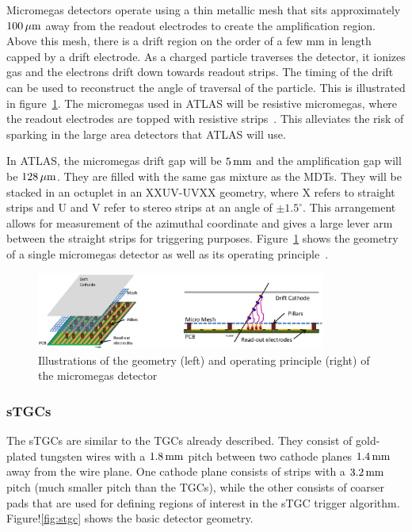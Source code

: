 Micromegas detectors operate using a thin metallic mesh that sits approximately $100\,\mu \rm m$ away from the readout electrodes to create the amplification region. Above this mesh, there is a drift region on the order of a few mm in length capped by a drift electrode. As a charged particle traverses the detector, it ionizes gas and the electrons drift down towards readout strips. The timing of the drift can be used to reconstruct the angle of traversal of the particle. This is illustrated in figure~\ref{fig:mm}. The micromegas used in ATLAS will be resistive micromegas, where the readout electrodes are topped with resistive strips~\cite{ResistiveMM}. This alleviates the risk of sparking in the large area detectors that ATLAS will use.

In ATLAS, the micromegas drift gap will be $5\,\rm mm$ and the amplification gap will be $128\,\mu \rm m$. They are filled with the same gas mixture as the MDTs. They will be stacked in an octuplet in an XXUV-UVXX geometry, where X refers to straight strips and U and V refer to stereo strips at an angle of $\pm 1.5^\circ$. This arrangement allows for measurement of the azimuthal coordinate and gives a large lever arm between the straight strips for triggering purposes. Figure~\ref{fig:mm} shows the geometry of a single micromegas detector as well as its operating principle~\cite{NSW_TDR}. 

\begin{figure}[h!]
  \centering
  \captionsetup{justification=centering}

  \includegraphics[width=0.85\textwidth]{figures/MM}
   \caption{Illustrations of the geometry (left) and operating principle (right) of the micromegas detector~\cite{NSW_TDR}}
  \label{fig:mm}
\end{figure}

\subsubsection{sTGCs}

The sTGCs are similar to the TGCs already described. They consist of gold-plated tungsten wires with a $1.8\,\rm mm$ pitch between two cathode planes $1.4\, \rm mm$ away from the wire plane. One cathode plane consists of strips with a $3.2\,\rm mm$ pitch (much smaller pitch than the TGCs), while the other consists of coarser pads that are used for defining regions of interest in the sTGC trigger algorithm. Figure!\ref{fig:stgc} shows the basic detector geometry. 

